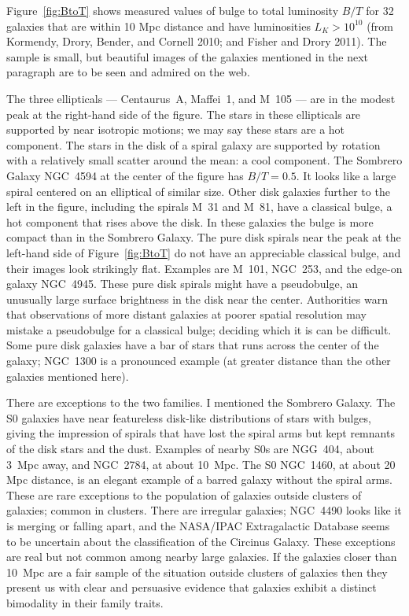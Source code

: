 \documentclass[fleqn,usenatbib]{mnras}
\begin{document}
Figure~\ref{fig:BtoT} shows measured values of bulge to total luminosity $B/T$ for 32 galaxies that are within 10 Mpc distance and have luminosities $L_K > 10^{10}$ (from Kormendy, Drory, Bender, and Cornell 2010; and Fisher and Drory 2011). The sample is small, but beautiful images of the galaxies mentioned in the next paragraph are to be seen and admired on the web. 

The three ellipticals --- Centaurus~A, Maffei~1, and M~105 --- are in the modest peak at the right-hand side of the figure. The stars in these ellipticals are supported by near isotropic motions; we may say these stars are a hot component. The stars in the disk of a spiral galaxy are supported by rotation with a relatively small scatter around the mean: a cool component. The Sombrero Galaxy NGC~4594 at the center of the figure has $B/T=0.5$. It looks like a large spiral centered on an elliptical of similar size. Other disk galaxies further to the left in the figure, including the spirals M~31 and M~81, have a classical bulge, a hot component that rises above the disk. In these galaxies the bulge is more compact than in the Sombrero Galaxy. The pure disk spirals near the peak at the left-hand side of Figure~\ref{fig:BtoT} do not have an appreciable classical bulge, and their images look strikingly flat. Examples are M~101, NGC~253, and the edge-on galaxy NGC~4945. These pure disk spirals might have a pseudobulge, an unusually large surface brightness in the disk near the center. Authorities warn that observations of more distant galaxies at poorer spatial resolution may mistake a pseudobulge for a classical bulge; deciding which it is can be difficult. Some pure disk galaxies have a bar of stars that runs across the center of the galaxy; NGC~1300 is a pronounced example (at greater distance than the other galaxies mentioned here). 

There are exceptions to the two families. I mentioned the Sombrero Galaxy. The S0 galaxies have near featureless disk-like distributions of stars with bulges, 
giving the impression of spirals that have lost the spiral arms but kept remnants of the disk stars and the dust. Examples of nearby S0s are NGG~404, about 3~Mpc away, and NGC~2784, at about 10~Mpc. The S0 NGC~1460, at about 20 Mpc distance, is an elegant example of a barred galaxy without the spiral arms. These are rare exceptions to the population of galaxies outside clusters of galaxies; common in clusters. There are irregular galaxies; NGC~4490 looks like it is merging or falling apart, and the NASA/IPAC Extragalactic Database seems to be uncertain about the classification of the Circinus Galaxy. These exceptions are real but not common among nearby large galaxies. If the galaxies closer than 10~Mpc are a fair sample of the situation outside clusters of galaxies then they present us with clear and persuasive evidence that galaxies exhibit a distinct bimodality in their family traits.
\end{document}
